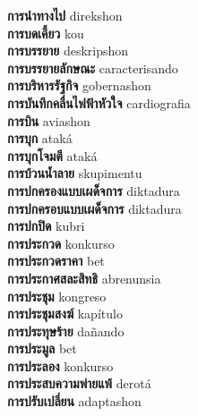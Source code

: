 \textbf{ การนำทางไป  } direkshon \\
\textbf{ การบดเคี้ยว  } kou \\
\textbf{ การบรรยาย  } deskripshon \\
\textbf{ การบรรยายลักษณะ  } caracterisando \\
\textbf{ การบริหารรัฐกิจ  } gobernashon \\
\textbf{ การบันทึกคลื่นไฟฟ้าหัวใจ  } cardiografia \\
\textbf{ การบิน  } aviashon \\
\textbf{ การบุก  } ataká \\
\textbf{ การบุกโจมตี  } ataká \\
\textbf{ การบ้วนน้ำลาย  } skupimentu \\
\textbf{ การปกครองแบบเผด็จการ  } diktadura \\
\textbf{ การปกครอบแบบเผด็จการ  } diktadura \\
\textbf{ การปกปิด  } kubri \\
\textbf{ การประกวด  } konkurso \\
\textbf{ การประกวดราคา  } bet \\
\textbf{ การประกาศสละสิทธิ  } abrenunsia \\
\textbf{ การประชุม  } kongreso \\
\textbf{ การประชุมสงฆ์  } kapítulo \\
\textbf{ การประทุษร้าย  } dañando \\
\textbf{ การประมูล  } bet \\
\textbf{ การประลอง  } konkurso \\
\textbf{ การประสบความพ่ายแพ้  } derotá \\
\textbf{ การปรับเปลี่ยน  } adaptashon \\
